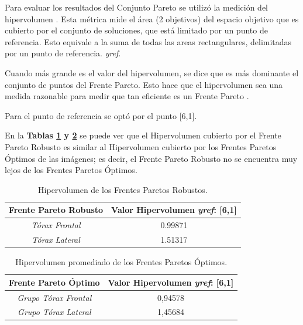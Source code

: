 Para evaluar los resultados del Conjunto Pareto se utilizó la medición del hipervolumen \cite{hypervolume}. Esta métrica mide el área (2 objetivos) del espacio objetivo que es cubierto por el conjunto de soluciones, que está limitado por un punto de referencia. Esto equivale a la suma de todas las areas rectangulares, delimitadas por un punto de referencia. {\it yref}.

Cuando más grande es el valor del hipervolumen, se dice que es más dominante el conjunto de puntos del Frente Pareto. Esto hace que el hipervolumen sea una medida razonable para medir que tan eficiente es un Frente Pareto \cite{shah2016pareto}.

Para el punto de referencia se optó por el punto [6,1].

En la \textbf{Tablas \ref{tabla:hipervolumen-robustos} y \ref{tabla:hipervolumen-promedio-optimo}} se puede ver que el Hipervolumen cubierto por el Frente Pareto Robusto es similar al Hipervolumen cubierto por los Frentes Paretos Óptimos de las imágenes; es decir, el Frente Pareto Robusto no se encuentra muy lejos de los Frentes Paretos Óptimos. 
\begin{table}[H]
\centering
\caption{Hipervolumen de los Frentes Paretos Robustos.}
\begin{tabular}{|c|c|}
\hline
Frente Pareto Robusto & Valor Hipervolumen {\it yref}: [6,1] \\
\hline \hline 
\it{Tórax Frontal} & 0.99871 \\ \hline
\it{Tórax Lateral}  & 1.51317\\ \hline
\end{tabular}
\label{tabla:hipervolumen-robustos}
\end{table}

\begin{table}[H]
\centering
\caption{Hipervolumen promediado de los Frentes Paretos Óptimos.}
\begin{tabular}{|c|c|}
\hline
Frente Pareto Óptimo & Valor Hipervolumen {\it yref}: [6,1] \\
\hline \hline 
\it{Grupo Tórax Frontal} & 0,94578 \\ \hline
\it{Grupo Tórax Lateral}  & 1,45684\\ \hline
\end{tabular}
\label{tabla:hipervolumen-promedio-optimo}
\end{table}